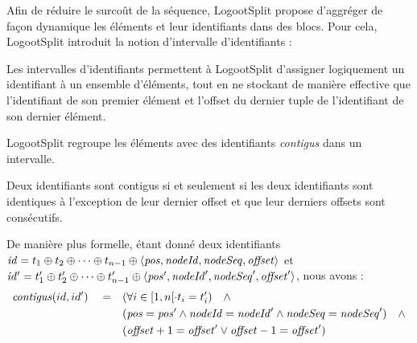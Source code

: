 \label{sec:blocs}

Afin de réduire le surcoût de la séquence, LogootSplit propose d'aggréger de façon dynamique les éléments et leur identifiants dans des blocs.
Pour cela, LogootSplit introduit la notion d'intervalle d'identifiants :

\noindent{}

Les intervalles d'identifiants permettent à LogootSplit d'assigner logiquement un identifiant à un ensemble d'éléments, tout en ne stockant de manière effective que l'identifiant de son premier élément et l'offset du dernier tuple de l'identifiant de son dernier élément.

LogootSplit regroupe les éléments avec des identifiants \emph{contigus} dans un intervalle.
\begin{definition}
  Deux identifiants sont contigus si et seulement si les deux identifiants sont identiques à l'exception de leur dernier offset et que leur derniers offsets sont consécutifs.

  De manière plus formelle, étant donné deux identifiants $\mathit{id} = t_1 \oplus t_2 \oplus \cdots \oplus t_{n-1} \oplus \langle \mathit{pos},\mathit{nodeId},\mathit{nodeSeq},\mathit{offset} \rangle$ et $\mathit{id'} = t^\prime_1 \oplus t^\prime_2 \oplus \cdots \oplus t^\prime_{n-1} \oplus \langle \mathit{pos}',\mathit{nodeId}',\mathit{nodeSeq}',\mathit{offset}' \rangle$, nous avons :
  \begin{equation*}
    \begin{split}
      \mathit{contigus}(id,id') \quad = \quad     & (\forall i \in [1,n[ \cdot t_i = t'_i) \quad \land \\
                                            & (\mathit{pos} = \mathit{pos}' \land \mathit{nodeId} = \mathit{nodeId}' \land \mathit{nodeSeq} = \mathit{nodeSeq}') \quad \land \\
                                            & (\mathit{offset} + 1 = \mathit{offset}' \lor \mathit{offset} - 1 = \mathit{offset}') \\
    \end{split}
  \end{equation*}
\end{definition}

